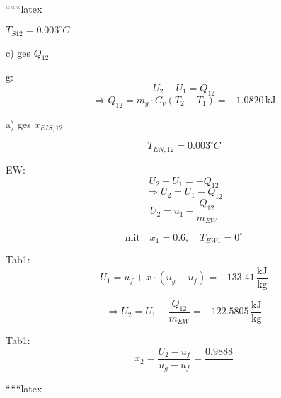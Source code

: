 ``````latex


$T_{S12} = 0.003^\circ C$

c) ges $Q_{12}$

g: 
\[
U_2 - U_1 = Q_{12}
\]
\[
\Rightarrow Q_{12} = m_g \cdot C_v (T_2 - T_1) = -1.0820 \, \text{kJ}
\]

a) ges $x_{EIS,12}$

\[
T_{EN,12} = 0.003^\circ C
\]

EW:
\[
U_2 - U_1 = -Q_{12}
\]
\[
\Rightarrow U_2 = U_1 - Q_{12}
\]
\[
U_2 = u_1 - \frac{Q_{12}}{m_{EW}}
\]

\[
\text{mit} \quad x_1 = 0.6, \quad T_{EW1} = 0^\circ
\]

Tab1:
\[
U_1 = u_f + x \cdot (u_g - u_f) = -133.41 \, \frac{\text{kJ}}{\text{kg}}
\]

\[
\Rightarrow U_2 = U_1 - \frac{Q_{12}}{m_{EW}} = -122.5805 \, \frac{\text{kJ}}{\text{kg}}
\]

Tab1:
\[
x_2 = \frac{U_2 - u_f}{u_g - u_f} = \frac{0.9888}{}
\]

``````latex



